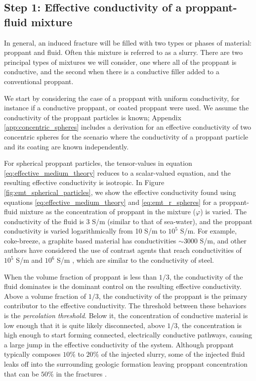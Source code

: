 \subsection{Step 1: Effective conductivity of a proppant-fluid mixture}
In general, an induced fracture will be filled with two types or phases of material: proppant and fluid. Often this mixture is referred to as a slurry. There are two principal types of mixtures we will consider, one where all of the proppant is conductive, and the second when there is a conductive filler added to a conventional proppant.

We start by considering the case of a proppant with uniform conductivity, for instance if a conductive proppant, or coated proppant were used. We assume the conductivity of the proppant particles is known; Appendix \ref{app:concentric_spheres} includes a derivation for an effective conductivity of two concentric spheres for the scenario where the conductivity of a proppant particle and its coating are known independently.

For spherical proppant particles, the tensor-values in equation \ref{eq:effective_medium_theory} reduces to a scalar-valued equation, and the resulting effective conductivity is isotropic. In Figure \ref{fig:emt_spherical_particles}, we show the effective conductivity found using equations \ref{eq:effective_medium_theory} and \ref{eq:emt_r_spheres} for a proppant-fluid mixture as the concentration of proppant in the mixture ($\varphi$) is varied. The conductivity of the fluid is 3 S/m (similar to that of sea-water), and the proppant conductivity is varied logarithmically from 10 S/m to $10^5$ S/m. For example, coke-breeze, a graphite based material has conductivities $\sim 3000$ S/m, and other authors have considered the use of contrast agents that reach conductivities of $10^5$ S/m \cite{Weiss2015} and $10^6$ S/m \cite{Pardo2013}, which are similar to the conductivity of steel.




When the volume fraction of proppant is less than $1/3$, the conductivity of the fluid dominates is the dominant control on the resulting effective conductivity. Above a volume  fraction of $1/3$, the conductivity of the proppant is the primary contributor to the effective conductivity. The threshold between these behaviors is the \emph{percolation threshold}. Below it, the concentration of conductive material is low enough that it is quite likely disconnected, above $1/3$, the concentration is high enough to start forming connected, electrically conductive pathways, causing a large jump in the effective conductivity of the system. Although proppant typically composes $10\%$ to $20\%$ of the injected slurry, some of the injected fluid leaks off into the surrounding geologic formation leaving proppant concentration that can be $50\%$ in the fractures \cite{Novotny1977, Hoversten2015}.

